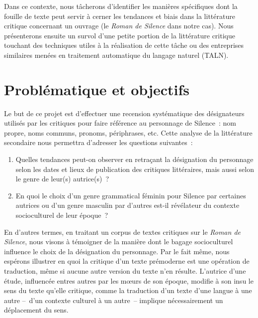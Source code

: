 \documentclass[hidelinks, 11pt, letterpaper]{article}
\begin{document}
Dans ce contexte, nous tâcherons d'identifier les manières spécifiques dont la fouille de texte peut servir à cerner les tendances et biais dans la littérature critique concernant un ouvrage (le \emph{Roman de Silence} dans notre cas).
Nous présenterons ensuite un survol d'une petite portion de la littérature critique touchant des techniques utiles à la réalisation de cette tâche ou des entreprises similaires menées en traitement automatique du langage naturel (TALN).

\newpage

\section*{Problématique et objectifs}
Le but de ce projet est d'effectuer une recension systématique des désignateurs \parencite{Kripke1980} utilisés par les critiques pour faire référence au personnage de Silence~: nom propre, noms communs, pronoms, périphrases, etc.
Cette analyse de la littérature secondaire nous permettra d'adresser les questions suivantes~:
\begin{enumerate}
    \item Quelles tendances peut-on observer en retraçant la désignation du personnage selon les dates et lieux de publication des critiques littéraires, mais aussi selon le genre de leur(s) autrice(s)~?
    \item En quoi le choix d'un genre grammatical féminin pour Silence par certaines autrices ou d'un genre masculin par d'autres est-il révélateur du contexte socioculturel de leur époque~?
\end{enumerate}
En d'autres termes, en traitant un corpus de textes critiques sur le \emph{Roman de Silence}, nous visons à témoigner de la manière dont le bagage socioculturel influence le choix de la désignation du personnage.
Par le fait même, nous espérons illustrer en quoi la critique d'un texte prémoderne est une opération de traduction, même si aucune autre version du texte n'en résulte.
L'autrice d'une étude, influencée entres autres par les m\oe urs de son époque, modifie à son insu le sens du texte qu'elle critique, comme la traduction d'un texte d'une langue à une autre --~d'un contexte culturel à un autre~-- implique nécessairement un déplacement du sens. %
\end{document}
